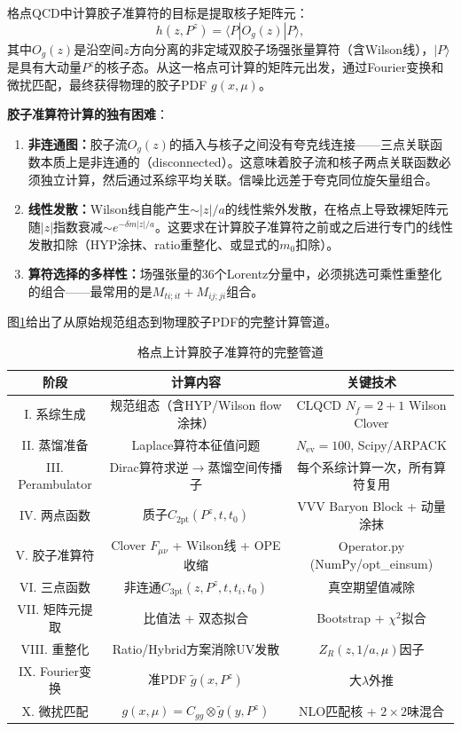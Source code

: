 \documentclass[12pt,a4paper]{ctexart}
\theoremstyle{definition}
\begin{document}
格点QCD中计算胶子准算符的目标是提取核子矩阵元：
\begin{equation}
h(z, P^z) = \langle P| O_g(z) |P\rangle,
\label{eq:target_me}
\end{equation}
其中$O_g(z)$是沿空间$z$方向分离的非定域双胶子场强张量算符（含Wilson线），$|P\rangle$是具有大动量$P^z$的核子态。从这一格点可计算的矩阵元出发，通过Fourier变换和微扰匹配，最终获得物理的胶子PDF $g(x,\mu)$。

\textbf{胶子准算符计算的独有困难}\cite{Fan2018gluon,Chen2025gluon,NoteGluonPDFs}：
\begin{enumerate}
    \item \textbf{非连通图：}胶子流$O_g(z)$的插入与核子之间没有夸克线连接——三点关联函数本质上是非连通的（disconnected）。这意味着胶子流和核子两点关联函数必须独立计算，然后通过系综平均关联。信噪比远差于夸克同位旋矢量组合。
    \item \textbf{线性发散：}Wilson线自能产生$\sim |z|/a$的线性紫外发散，在格点上导致裸矩阵元随$|z|$指数衰减$\sim e^{-\delta m |z|/a}$。这要求在计算胶子准算符之前或之后进行专门的线性发散扣除（HYP涂抹、ratio重整化、或显式的$m_0$扣除）。
    \item \textbf{算符选择的多样性：}场强张量的36个Lorentz分量中，必须挑选可乘性重整化的组合——最常用的是$M_{ti;it}+M_{ij;ji}$组合\cite{Balitsky2020}。
\end{enumerate}

图\ref{fig:pipeline}给出了从原始规范组态到物理胶子PDF的完整计算管道。

\begin{table}[H]
\centering
\caption{格点上计算胶子准算符的完整管道}
\label{fig:pipeline}
\begin{tabular}{c|c|c}
\toprule
\textbf{阶段} & \textbf{计算内容} & \textbf{关键技术} \\
\midrule
I. 系综生成 & 规范组态（含HYP/Wilson flow涂抹） & CLQCD $N_f=2+1$ Wilson Clover \\
II. 蒸馏准备 & Laplace算符本征值问题 & $N_{\text{ev}}=100$, Scipy/ARPACK \\
III. Perambulator & Dirac算符求逆$\to$蒸馏空间传播子 & 每个系综计算一次，所有算符复用 \\
IV. 两点函数 & 质子$C_{2\text{pt}}(P^z,t,t_0)$ & VVV Baryon Block + 动量涂抹 \\
V. 胶子准算符 & Clover $F_{\mu\nu}$ + Wilson线 + OPE收缩 & Operator.py (NumPy/opt\_einsum) \\
VI. 三点函数 & 非连通$C_{3\text{pt}}(z,P^z,t,t_i,t_0)$ & 真空期望值减除 \\
VII. 矩阵元提取 & 比值法 + 双态拟合 & Bootstrap + $\chi^2$拟合 \\
VIII. 重整化 & Ratio/Hybrid方案消除UV发散 & $Z_R(z,1/a,\mu)$因子 \\
IX. Fourier变换 & 准PDF $\tilde{g}(x,P^z)$ & 大$\lambda$外推 \\
X. 微扰匹配 & $g(x,\mu)=C_{gg}\otimes \tilde{g}(y,P^z)$ & NLO匹配核 + $2\times2$味混合 \\
\bottomrule
\end{tabular}
\end{table}
\end{document}
